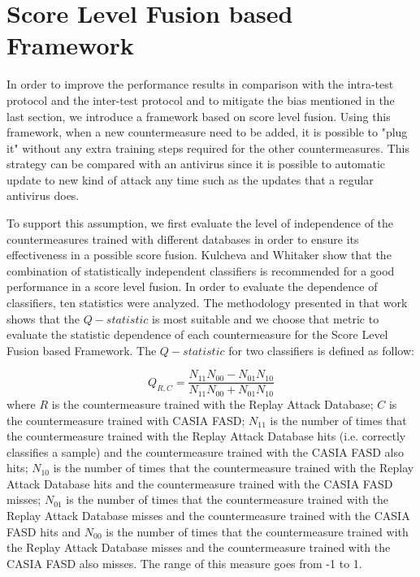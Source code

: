 \section{Score Level Fusion based Framework}
\label{sec:framework}

In order to improve the performance results in comparison with the intra-test protocol and the inter-test protocol and to mitigate the bias mentioned in the last section, we introduce a framework based on score level fusion. Using this framework, when a new countermeasure need to be added, it is possible to "plug it" without any extra training steps required for the other countermeasures. This strategy can be compared with an antivirus since it is possible to automatic update to new kind of attack any time such as the updates that a regular antivirus does.

To support this assumption, we first evaluate the level of independence of the countermeasures trained with different databases in order to ensure its effectiveness in a possible score fusion. Kulcheva and Whitaker \cite{kuncheva2003measures} show that the combination of statistically independent classifiers is recommended for a good performance in a score level fusion. In order to evaluate the dependence of classifiers, ten statistics were analyzed. The methodology presented in that work shows that the $Q-statistic$ is most suitable and we choose that metric to evaluate the statistic dependence of each countermeasure for the Score Level Fusion based Framework. The $Q-statistic$ for two classifiers is defined as follow:

\begin{equation}
\label{eq:Qstatistic}
Q_{R,C} = \frac{N_{11}N_{00} - N_{01}N_{10}}{N_{11}N_{00} +N_{01}N_{10}}
\end{equation}
where $R$ is the countermeasure trained with the Replay Attack Database; $C$ is the countermeasure trained with CASIA FASD; $N_{11}$ is the number of times that the countermeasure trained with the Replay Attack Database hits (i.e. correctly classifies a sample) and the countermeasure trained with the CASIA FASD also hits; $N_{10}$ is the number of times that the countermeasure trained with the Replay Attack Database hits and the countermeasure trained with the CASIA FASD misses; $N_{01}$ is the number of times that the countermeasure trained with the Replay Attack Database misses and the countermeasure trained with the CASIA FASD hits and $N_{00}$ is the number of times that the countermeasure trained with the Replay Attack Database misses and the countermeasure trained with the CASIA FASD also misses. The range of this measure goes from -1 to 1.

